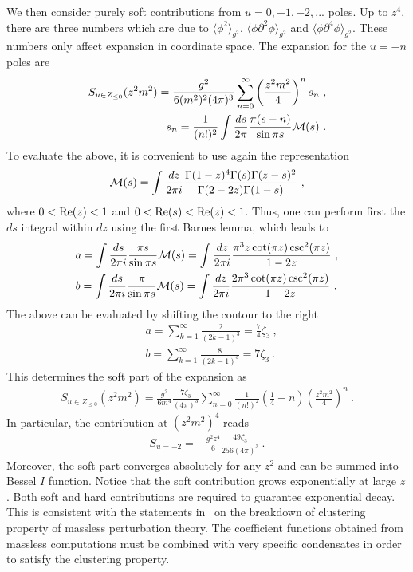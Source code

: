 \documentclass[a4paper,11pt]{article}
\begin{document}
We then consider purely soft contributions from $u=0,-1,-2,...$ poles. Up to $z^4$, there are three numbers which are due to $\langle \phi^2\rangle_{g^2}$, $\langle\phi \partial^2\phi\rangle_{g^2}$ and $\langle \phi \partial^4\phi\rangle_{g^2}$. These numbers only affect expansion in coordinate space. The expansion for the $u=-n$ poles are
\begin{align}
S_{u \in Z_{\le 0}}(z^2m^2)=\frac{g^2}{6(m^2)^2(4\pi)^3}\sum_{n=0}^{\infty}\left(\frac{z^2m^2}{4}\right)^ns_n \ , \\
s_n=\frac{1}{(n!)^2}\int \frac{ds}{2\pi}\frac{\pi  (s-n)}{ \sin \pi s}{\cal M}(s) \ .
\end{align}
To evaluate the above, it is convenient to use again the representation 
\begin{align}
{\cal M}(s)=\int \frac{dz}{2\pi i}\frac{\Gamma (1-z)^4 \Gamma (s) \Gamma (z-s)^2}{\Gamma (2-2 z) \Gamma (1-s)} \ ,
\end{align}
where $0<{\rm Re}(z)<1$ and $0<{\rm Re}(s)<{\rm Re}(z)<1$. Thus, one can perform first the $ds$ integral within $dz$ using the first Barnes lemma, which leads to
\begin{align}
& a=\int \frac{ds}{2\pi i}\frac{\pi s}{\sin \pi s}{\cal M}(s)=\int \frac{dz}{2\pi i}\frac{\pi ^3 z\cot (\pi  z) \csc ^2(\pi  z)}{1-2 z} \ , \\
& b=\int \frac{ds}{2\pi i}\frac{\pi }{\sin \pi s}{\cal M}(s)=\int \frac{dz}{2\pi i} \frac{2 \pi ^3 \cot (\pi  z) \csc ^2(\pi  z)}{1-2 z} \ .
\end{align}
The above can be evaluated by shifting the contour to the right
\begin{align}
& a=\sum_{k=1}^{\infty}\frac{2}{(2k-1)^3}=\frac{7}{4}\zeta_3
 \ ,  \\ 
 & b=\sum_{k=1}^{\infty}\frac{8}{(2k-1)^3}=7\zeta_3 \ .
 \end{align}
This determines the soft part of the expansion as
\begin{align}
S_{u \in Z_{\le 0}}(z^2m^2)=\frac{g^2}{6m^4}\frac{7\zeta_3}{(4\pi)^3}\sum_{n=0}^{\infty} \frac{1}{(n!)^2}\left(\frac{1}{4}-n\right)\left(\frac{z^2m^2}{4}\right)^n \ .
\end{align}
In particular, the contribution at $(z^2m^2)^4$ reads
\begin{align}
S_{u =-2}=-\frac{g^2z^4}{6}\frac{49\zeta_3}{256(4\pi)^3} \ .
\end{align}
Moreover, the soft part converges absolutely for any $z^2$ and can be summed into  Bessel $I$ function. Notice that the soft contribution grows exponentially at large $z$. Both soft and hard contributions are required to guarantee exponential decay. This is consistent with the
statements in~\cite{Parisi:1978az} on the breakdown of clustering property of massless perturbation theory. The coefficient functions obtained from massless computations must be combined with very specific condensates in order to satisfy the clustering property. 
\end{document}
